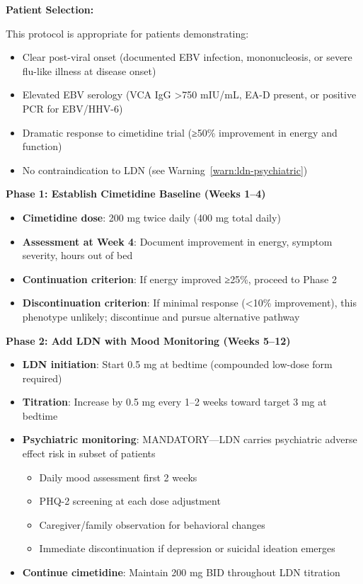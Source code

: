 \begin{protocol}
\label{prot:cimetidine-ldn-protocol}

\textbf{Patient Selection:}

This protocol is appropriate for patients demonstrating:
\begin{itemize}
    \item Clear post-viral onset (documented EBV infection, mononucleosis, or severe flu-like illness at disease onset)
    \item Elevated EBV serology (VCA IgG >750 mIU/mL, EA-D present, or positive PCR for EBV/HHV-6)
    \item Dramatic response to cimetidine trial (≥50\% improvement in energy and function)
    \item No contraindication to LDN (see Warning~\ref{warn:ldn-psychiatric})
\end{itemize}

\textbf{Phase 1: Establish Cimetidine Baseline (Weeks 1--4)}

\begin{itemize}
    \item \textbf{Cimetidine dose}: 200 mg twice daily (400 mg total daily)
    \item \textbf{Assessment at Week 4}: Document improvement in energy, symptom severity, hours out of bed
    \item \textbf{Continuation criterion}: If energy improved ≥25\%, proceed to Phase 2
    \item \textbf{Discontinuation criterion}: If minimal response (<10\% improvement), this phenotype unlikely; discontinue and pursue alternative pathway
\end{itemize}

\textbf{Phase 2: Add LDN with Mood Monitoring (Weeks 5--12)}

\begin{itemize}
    \item \textbf{LDN initiation}: Start 0.5 mg at bedtime (compounded low-dose form required)
    \item \textbf{Titration}: Increase by 0.5 mg every 1--2 weeks toward target 3 mg at bedtime
    \item \textbf{Psychiatric monitoring}: MANDATORY---LDN carries psychiatric adverse effect risk in subset of patients
    \begin{itemize}
        \item Daily mood assessment first 2 weeks
        \item PHQ-2 screening at each dose adjustment
        \item Caregiver/family observation for behavioral changes
        \item Immediate discontinuation if depression or suicidal ideation emerges
    \end{itemize}
    \item \textbf{Continue cimetidine}: Maintain 200 mg BID throughout LDN titration
\end{itemize}


\end{protocol}

